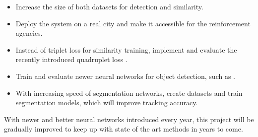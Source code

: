 \documentclass[a4paper,12pt,titlepage, twoside]{article}
\numberwithin{figure}{section}
\begin{document}
\begin{itemize}
\item Increase the size of both datasets for detection and similarity.
\item Deploy the system on a real city and make it accessible for the reinforcement agencies.
\item Instead of triplet loss for similarity training, implement and evaluate the recently introduced quadruplet loss \cite{chen2017beyond}.
\item Train and evaluate newer neural networks for object detection, such as \cite{lin2017focal, redmon2018yolov3}.
\item With increasing speed of segmentation networks, create datasets and train segmentation models, which will improve tracking accuracy.
\end{itemize}

With newer and better neural networks introduced every year, this project will be gradually improved to keep up with state of the art methods in years to come.


\cleardoublepage

{}
\cleardoublepage
\clearpage



%
\end{document}
